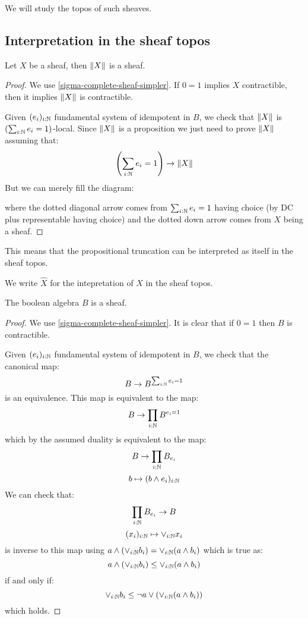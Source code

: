 We will study the topos of such sheaves.


\subsection{Interpretation in the sheaf topos}

\begin{lemma}\label{prop-trunc-sheaf-sigma-complete}
Let $X$ be a sheaf, then $\lVert X \rVert$ is a sheaf. 
\end{lemma}

\begin{proof}
We use \cref{sigma-complete-sheaf-simpler}. If $0=1$ implies $X$ contractible, then it implies $\lVert X \rVert$ is contractible.

Given $(e_i)_{i:\mathbb{N}}$ fundamental system of idempotent in $B$, we check that $\lVert X \rVert$ is $(\sum_{i:\mathbb{N}} e_i=1)$-local. Since $\lVert X \rVert$ is a proposition we just need to prove $\lVert X \rVert$ assuming that:
\[\left(\sum_{i:\mathbb{N}} e_i=1\right) \to \lVert X \rVert\]
But we can merely fill the diagram:
\begin{center}
\end{center}
where the dotted diagonal arrow comes from $\sum_{i:\mathbb{N}} e_i=1$ having choice (by DC plus representable having choice) and the dotted down arrow comes from $X$ being a sheaf.
\end{proof}

This means that the propositional truncation can be interpreted as itself in the sheaf topos.

We write $\hat{X}$ for the intepretation of $X$ in the sheaf topos. 

\begin{lemma}
The boolean algebra $B$ is a sheaf.
\end{lemma}

\begin{proof}
We use \cref{sigma-complete-sheaf-simpler}. It is clear that if $0=1$ then $B$ is contractible.

Given $(e_i)_{i:\mathbb{N}}$ fundamental system of idempotent in $B$, we check that the canonical map:
\[B\to B^{\sum_{i:\mathbb{N}} e_i=1}\]
is an equivalence. This map is equivalent to the map:
\[B\to \prod_{i:\mathbb{N}} B^{e_i=1}\]
which by the assumed duality is equivalent to the map:
\[B\to \prod_{i:\mathbb{N}} B_{e_i}\]
\[b \mapsto (b\land e_i)_{i:\mathbb{N}}\]
We can check that:
\[\prod_{i:\mathbb{N}} B_{e_i}\to B\]
\[(x_i)_{i:\mathbb{N}}\mapsto \lor_{i:\mathbb{N}} x_i\]
is inverse to this map using $a\land(\lor_{i:\mathbb{N}} b_i) = \lor_{i:\mathbb{N}} (a\land b_i)$ which is true as:
\[a\land(\lor_{i:\mathbb{N}} b_i)\leq\lor_{i:\mathbb{N}} (a\land b_i) \]
if and only if:
\[\lor_{i:\mathbb{N}} b_i\leq\neg a\lor (\lor_{i:\mathbb{N}} (a\land b_i)) \]
which holds.
\end{proof}

